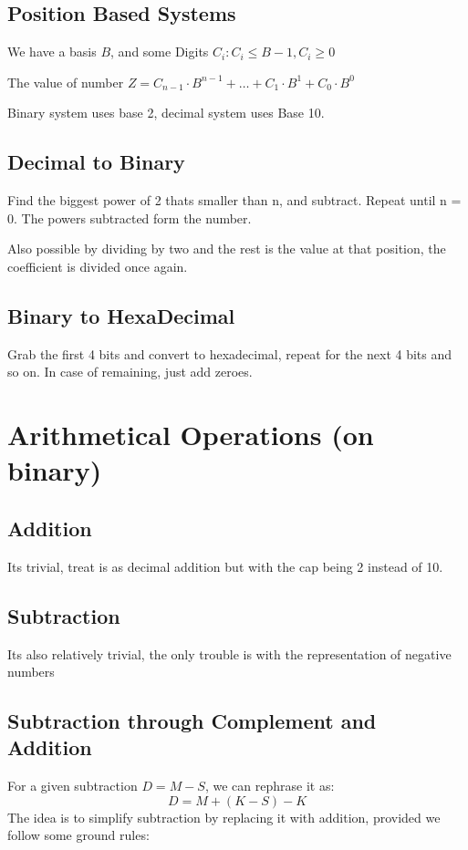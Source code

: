 \documentclass{article}
\begin{document}
\subsection{Position Based Systems}
We have a basis $B$, and some Digits $C_i: C_i \leq B-1, C_i \geq 0$

The value of number $Z = C_{n-1}\cdot B^{n-1} + \dots +C_1\cdot B^1 + C_0 \cdot B^0$

Binary system uses base 2, decimal system uses Base 10.

\subsection{Decimal to Binary}
Find the biggest power of 2 thats smaller than n, and subtract. Repeat until n = 0. The powers subtracted form the number.

Also possible by dividing by two and the rest is the value at that position, the coefficient is divided once again.

\subsection{Binary to HexaDecimal}
Grab the first 4 bits and convert to hexadecimal, repeat for the next 4 bits and so on. In case of remaining, just add zeroes.

\section{Arithmetical Operations (on binary)}
\subsection{Addition}
Its trivial, treat is as decimal addition but with the cap being 2 instead of 10.

\subsection{Subtraction}
Its also relatively trivial, the only trouble is with the representation of negative numbers
\subsection{Subtraction through Complement and Addition}

For a given subtraction $D = M - S$, we can rephrase it as:
\[
D = M + (K - S) - K
\]
The idea is to simplify subtraction by replacing it with addition, provided we follow some ground rules:
\end{document}
